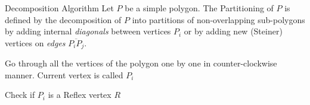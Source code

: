 \begin{frame}{Decomposition Algorithm}
Let $P$ be a simple polygon.  The Partitioning of $P$ is defined by the decomposition of $P$ into partitions of non-overlapping sub-polygons by adding internal {\em diagonals} between vertices  $P_i$ or by adding new (Steiner) vertices on {\em edges} $\overline{P_i P_j}$.

\begin{list}{}{}

\item 
Go through all the vertices of the polygon one by one in counter-clockwise manner. Current vertex is called $P_i$ %


\item 
Check if $P_i$ is a Reflex vertex $R$  %



\end{list}

\end{frame}


